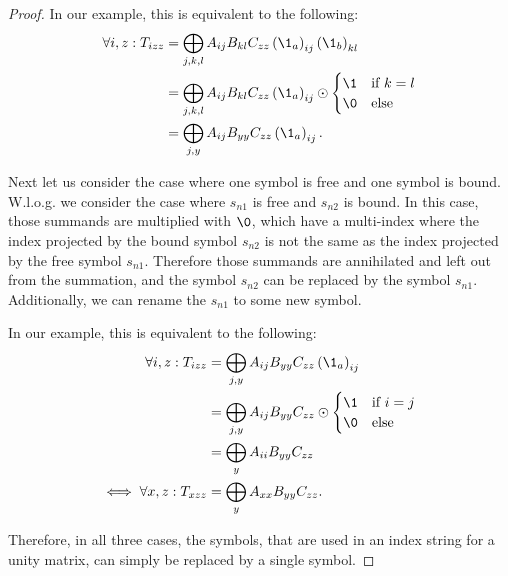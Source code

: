 \begin{proof}
    In our example, this is equivalent to the following:
    \begin{align*}
        \forall i,z: T_{izz} & = \bigoplus\limits_{j,k,l} A_{ij} B_{kl} C_{zz} \left(\1_a\right)_{ij} \left(\1_b\right)_{kl}          \\
                             & = \bigoplus\limits_{j,k,l} A_{ij} B_{kl} C_{zz} \left(\1_a\right)_{ij} \odot \begin{cases}
            \1 & \text{if $k = l$} \\
            \0 & \text{else}
        \end{cases} \\
                             & = \bigoplus\limits_{j,y} A_{ij} B_{yy} C_{zz} \left(\1_a\right)_{ij}.
    \end{align*}

    Next let us consider the case where one symbol is free and one symbol is bound.
    W.l.o.g. we consider the case where $s_{n1}$ is free and $s_{n2}$ is bound.
    In this case, those summands are multiplied with $\0$,
    which have a multi-index where the index projected by the bound symbol $s_{n2}$ is not the same as the index projected by the free symbol $s_{n1}$.
    Therefore those summands are annihilated and left out from the summation, and the symbol $s_{n2}$ can be replaced by the symbol $s_{n1}$.
    Additionally, we can rename the $s_{n1}$ to some new symbol.

    In our example, this is equivalent to the following:
    \begin{align*}
        \forall i,z: T_{izz}      & = \bigoplus\limits_{j,y} A_{ij} B_{yy} C_{zz} \left(\1_a\right)_{ij}          \\
                                  & = \bigoplus\limits_{j,y} A_{ij} B_{yy} C_{zz} \odot \begin{cases}
            \1 & \text{if $i = j$} \\
            \0 & \text{else}
        \end{cases} \\
                                  & = \bigoplus\limits_{y} A_{ii} B_{yy} C_{zz}                                   \\
        \iff \forall x,z: T_{xzz} & = \bigoplus\limits_{y} A_{xx} B_{yy} C_{zz}.
    \end{align*}

    Therefore, in all three cases, the symbols, that are used in an index string for a unity matrix, can simply be replaced by a single symbol.
\end{proof}